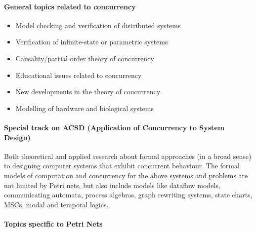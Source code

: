 \documentclass[10pt,a4paper]{article}
\begin{document}
\begin{multicols}{2}
\paragraph*{General topics related to concurrency}\mbox{}

\vspace*{-0.3cm}
\begin{itemize}
\item Model checking and verification of distributed systems
\item Verification of infinite-state or parametric systems
\item Causality/partial order theory of concurrency
\item Educational issues related to concurrency
\item New developments in the theory of concurrency
\item Modelling of hardware and biological systems
\end{itemize}

\vspace*{-0.5cm}
\paragraph*{Special track on ACSD (Application of Concurrency to System Design)}
Both theoretical and applied research about formal approaches (in a broad sense) to designing computer systems that exhibit concurrent behaviour.
The formal models of computation and concurrency for the above systems and problems are not limited by Petri nets, but also include models like dataflow models, communicating automata, process algebras, graph rewriting systems, state charts, MSCs, modal and temporal logics.


\columnbreak

\paragraph*{Topics specific to Petri Nets}\mbox{}


\end{multicols}
\end{document}
